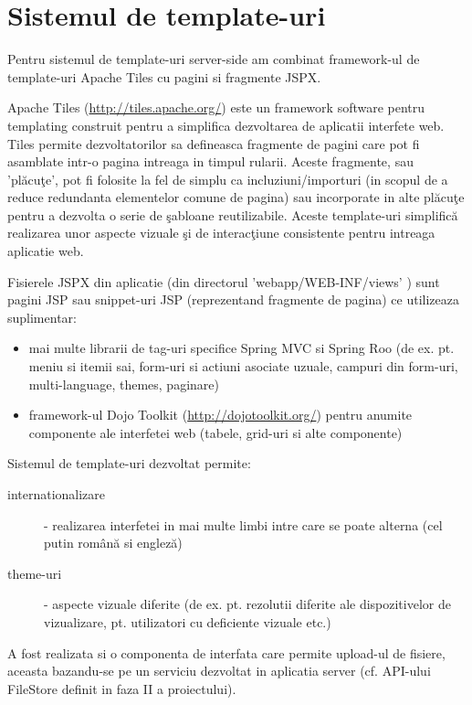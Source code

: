 \section{Sistemul de template-uri}
\label{template_system}

Pentru sistemul de template-uri server-side am combinat framework-ul de template-uri Apache Tiles cu pagini si fragmente JSPX.

Apache Tiles (\url{http://tiles.apache.org/}) este un framework software pentru templating construit pentru a simplifica dezvoltarea de aplicatii interfete web.
Tiles permite dezvoltatorilor sa defineasca fragmente de pagini care pot fi asamblate intr-o pagina intreaga in timpul rularii. 
Aceste fragmente, sau 'pl\u{a}cu\c{t}e', pot fi folosite la fel de simplu ca incluziuni/importuri (in scopul de a reduce redundanta elementelor comune de pagina) sau incorporate in alte pl\u{a}cu\c{t}e pentru a dezvolta o serie de \c{s}abloane reutilizabile. 
Aceste template-uri simplific\u{a} realizarea unor aspecte vizuale \c{s}i de interac\c{t}iune consistente pentru intreaga aplicatie web.

Fisierele JSPX din aplicatie (din directorul 'webapp/WEB-INF/views' ) sunt pagini JSP sau snippet-uri JSP (reprezentand fragmente de pagina) 
ce utilizeaza suplimentar:
\begin{itemize}
\item
mai multe librarii de tag-uri specifice Spring MVC si Spring Roo
(de ex. pt. meniu si itemii sai, form-uri si actiuni asociate uzuale, campuri din form-uri, multi-language, themes, paginare)
\item
framework-ul Dojo Toolkit (\url{http://dojotoolkit.org/}) pentru anumite componente ale interfetei web (tabele, grid-uri si alte componente)
\end{itemize}

Sistemul de template-uri dezvoltat permite:
\begin{description}
\item [internationalizare] - realizarea interfetei in mai multe limbi intre care se poate alterna (cel putin rom\^{a}n\u{a} si englez\u{a})
\item [theme-uri] - aspecte vizuale diferite (de ex. pt. rezolutii diferite ale dispozitivelor de vizualizare, pt. utilizatori cu deficiente vizuale etc.)
\end{description}

A fost realizata si o componenta de interfata care permite upload-ul de fisiere, aceasta bazandu-se pe un serviciu dezvoltat in aplicatia server 
(cf. API-ului FileStore definit in faza II a proiectului).

